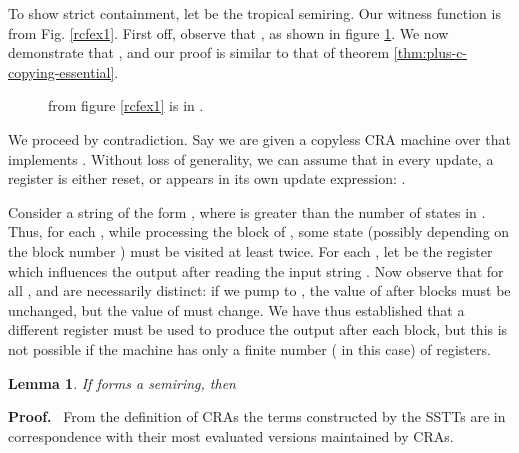 \documentclass[11pt]{article}
\newtheorem{lemma}[theorem]{Lemma}
\def\Proof{{\bf Proof.}}
\def\qed{{\bf }}
\def\qed{{\bf }}
\begin{document}
To show strict containment, let 
be the tropical semiring. Our witness function is  from Fig.
\ref{rcfex1}. First off, observe that ,
as shown in figure \ref{rcfex_f1}. We now demonstrate that ,
and our proof is similar to that of theorem \ref{thm:plus-c-copying-essential}.

\begin{figure}[t]
\centering
{}
\caption{ from figure \ref{rcfex1} is in . \label{rcfex_f1}}
\end{figure}

We proceed by contradiction. Say we are given a copyless CRA machine
 over  that implements . Without
loss of generality, we can assume that in every update, a register
 is either reset, or appears in its own update expression: .

Consider a string of the form , where 
is greater than the number of states in . Thus, for each ,
while processing the  block of , some state
 (possibly depending on the block number ) must be visited
at least twice. For each , let  be the register which
influences the output after reading the input string .
Now observe that for all ,  and  are necessarily
distinct: if we pump  to ,
the value of  after  blocks must be unchanged, but the
value of  must change. We have thus established that a different
register must be used to produce the output after each block, but
this is not possible if the machine has only a finite number ( in this case)
of registers.
\qed

\begin{lemma}
If  forms a semiring, then

\end{lemma}
\Proof~
From the definition of CRAs the terms constructed by the SSTTs are in correspondence with their most evaluated versions maintained by CRAs.
\qed
\end{document}
